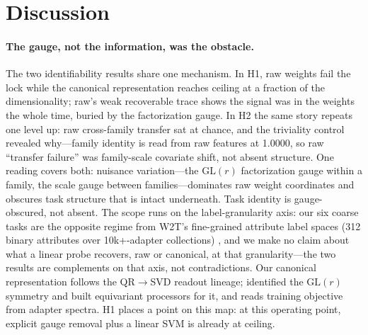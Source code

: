 \documentclass[10pt]{article}
\begin{document}
\section{Discussion}
\label{sec:discussion}

\paragraph{The gauge, not the information, was the obstacle.} The two
identifiability results share one mechanism. In H1, raw weights fail the
lock while the canonical representation reaches ceiling at a fraction of
the dimensionality; raw's weak recoverable trace shows the signal was in
the weights the whole time, buried by the factorization gauge. In H2 the
same story repeats one level up: raw cross-family transfer sat at chance,
and the triviality control revealed why---family identity is read from raw
features at 1.0000, so raw ``transfer failure'' was family-scale covariate
shift, not absent structure. One reading covers both: nuisance
variation---the $\mathrm{GL}(r)$ factorization gauge within a family, the
scale gauge between families---dominates raw weight coordinates and
obscures task structure that is intact underneath. Task identity is
gauge-obscured, not absent. The scope runs on the label-granularity axis:
our six coarse tasks are the opposite regime from W2T's fine-grained
attribute label spaces (312 binary attributes over 10k+-adapter
collections) \cite{w2t2026lora}, and we make no claim about what a linear
probe recovers, raw or canonical, at that granularity---the two results
are complements on that axis, not contradictions. Our canonical
representation follows the QR$\rightarrow$SVD readout lineage;
\cite{putterman2024lol} identified the $\mathrm{GL}(r)$ symmetry and
built equivariant processors for it, and \cite{paul2026spectral} reads
training objective from adapter spectra. H1 places a point on this map:
at this operating point, explicit gauge removal plus a linear SVM is
already at ceiling.
\end{document}
